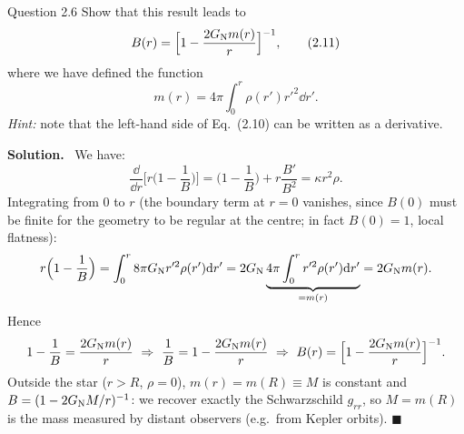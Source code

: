 \documentclass[11pt,a4paper]{article}
\numberwithin{equation}{subsection}
\newenvironment{solution}{\par\noindent\textbf{\textcolor{excol!70!black}{Solution.}}\ }{\hfill$\blacksquare$\par\medskip}
\newcommand{\added}[1]{{\color{teal!60!black}#1}}
\begin{document}
\begin{problem}{Question 2.6}
Show that this result leads to
\[
  B(r)=\Big[1-\frac{2G_{\mathrm N} m(r)}{r}\Big]^{-1}, \tag{2.11}
\]
where we have defined the function
\[
  m(r)=4\pi\int_0^r\rho(r')r'^2\dd r'. \tag{2.12}
\]
\emph{Hint:} note that the left-hand side of Eq.~(2.10) can be written as a derivative.
\end{problem}
\begin{solution}
We have:
\[
  \frac{\dd}{\dd r}\Big[r\Big(1-\frac1B\Big)\Big]=\Big(1-\frac1B\Big)+r\frac{B'}{B^2}=\kappa r^2\rho .
\]
Integrating from $0$ to $r$ \added{(the boundary term at $r=0$ vanishes, since $B(0)$ must be finite for the geometry to be regular at the centre; in fact $B(0)=1$, local flatness)}:
\[
  r\Big(1-\frac1B\Big)=\int_0^r8\pi G_{\mathrm N} r'^2\rho(r')\mathrm{d} r'=2G_{\mathrm N}\underbrace{4\pi\int_0^rr'^2\rho(r')\mathrm{d} r'}_{=m(r)}=2G_{\mathrm N} m(r).
\]
Hence
\[
  1-\frac1B=\frac{2\GN m(r)}{r}\ \Rightarrow\ \frac1B=1-\frac{2\GN m(r)}{r}\ \Rightarrow\ B(r)=\Big[1-\frac{2\GN m(r)}{r}\Big]^{-1}.
\]
\added{Outside the star ($r>R$, $\rho=0$), $m(r)=m(R)\equiv M$ is constant and $B=(1-2G_{\mathrm N} M/r)^{-1}$: we recover exactly the Schwarzschild $g_{rr}$, so $M=m(R)$ is the mass measured by distant observers (e.g.\ from Kepler orbits).}
\end{solution}
\end{document}
